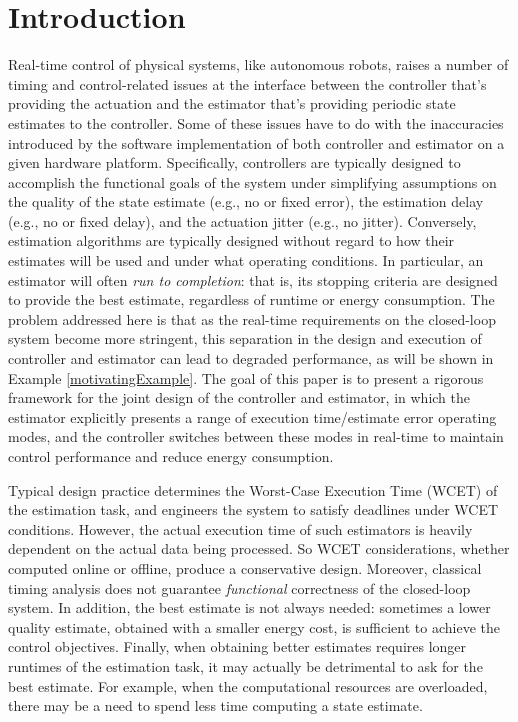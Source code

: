 \section{Introduction}
\label{introduction}

Real-time control of physical systems, like autonomous robots, raises a number of timing and control-related issues at the interface between the controller that's providing the actuation and the estimator that's providing periodic state estimates to the controller.
Some of these issues have to do with the inaccuracies introduced by the software implementation of both controller and estimator on a given hardware platform.
Specifically, controllers are typically designed to accomplish the functional goals of the system under simplifying assumptions on the quality of the state estimate (e.g., no or fixed error), the estimation delay (e.g., no or fixed delay), and the actuation jitter (e.g., no jitter).
Conversely, estimation algorithms are typically designed without regard to how their estimates will be used and under what operating conditions.
In particular, an estimator will often \emph{run to completion}: that is, its stopping criteria are designed to provide the best estimate, regardless of runtime or energy consumption.
The problem addressed here is that as the real-time requirements on the closed-loop system become more stringent, this separation in the design and execution of controller and estimator can lead to degraded performance, as will be shown in Example \ref{motivatingExample}.
The goal of this paper is to present a rigorous framework for the joint design of the controller and estimator, in which the estimator explicitly presents a range of execution time/estimate error operating modes, and the controller switches between these modes in real-time to maintain control performance and reduce energy consumption.

Typical design practice determines the Worst-Case Execution Time (WCET) of the estimation task, and engineers the system to satisfy deadlines under WCET conditions.
However, the actual execution time of such estimators is heavily dependent on the actual data being processed. 
So WCET considerations, whether computed online or offline, produce a conservative design.
Moreover, classical timing analysis does not guarantee \emph{functional} correctness of the closed-loop system.
In addition, the best estimate is not always needed:
sometimes a lower quality estimate, obtained with a smaller energy cost, is sufficient to achieve the control objectives.
Finally, when obtaining better estimates requires longer runtimes of the estimation task, it may actually be detrimental to ask for the best estimate.
For example, when the computational resources are overloaded, there may be a need to spend less time computing a state estimate. 

